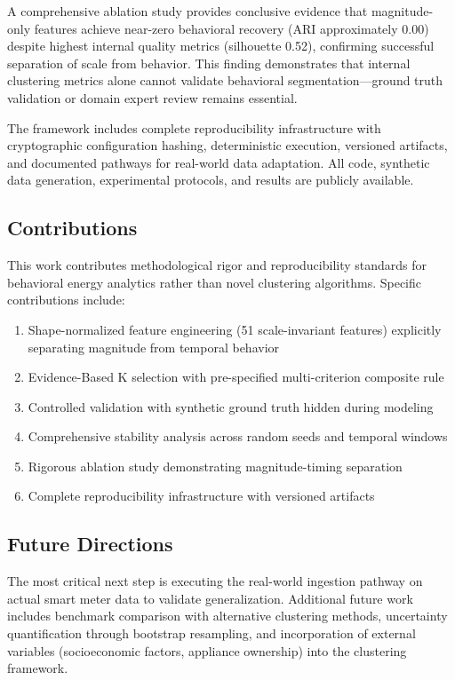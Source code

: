 \documentclass[11pt,a4paper]{article}
\begin{document}
A comprehensive ablation study provides conclusive evidence that magnitude-only features achieve near-zero behavioral recovery (ARI approximately 0.00) despite highest internal quality metrics (silhouette 0.52), confirming successful separation of scale from behavior. This finding demonstrates that internal clustering metrics alone cannot validate behavioral segmentation---ground truth validation or domain expert review remains essential.

The framework includes complete reproducibility infrastructure with cryptographic configuration hashing, deterministic execution, versioned artifacts, and documented pathways for real-world data adaptation. All code, synthetic data generation, experimental protocols, and results are publicly available.

\subsection{Contributions}

This work contributes methodological rigor and reproducibility standards for behavioral energy analytics rather than novel clustering algorithms. Specific contributions include:

\begin{enumerate}
    \item Shape-normalized feature engineering (51 scale-invariant features) explicitly separating magnitude from temporal behavior
    \item Evidence-Based K selection with pre-specified multi-criterion composite rule
    \item Controlled validation with synthetic ground truth hidden during modeling
    \item Comprehensive stability analysis across random seeds and temporal windows
    \item Rigorous ablation study demonstrating magnitude-timing separation
    \item Complete reproducibility infrastructure with versioned artifacts
\end{enumerate}

\subsection{Future Directions}

The most critical next step is executing the real-world ingestion pathway on actual smart meter data to validate generalization. Additional future work includes benchmark comparison with alternative clustering methods, uncertainty quantification through bootstrap resampling, and incorporation of external variables (socioeconomic factors, appliance ownership) into the clustering framework.
\end{document}
